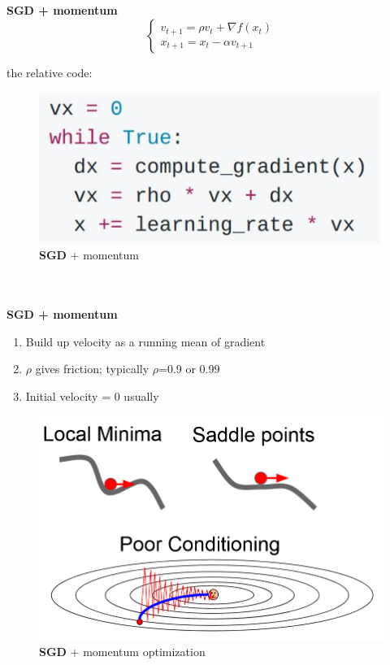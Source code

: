 \documentclass[11pt]{article}
\begin{document}
\begin{minipage}{0.5\textwidth}

\textbf{SGD + momentum}
\begin{equation}
\begin{cases}
v_{t+1}=\rho v_t+\nabla f(x_t) \\
    x_{t+1}=x_t-\alpha v_{t+1}
    \end{cases}{}
\end{equation}{}

the relative code:
\begin{figure} [H]
\centering 
\includegraphics[scale=0.58]{L611.pdf}
\caption{ \textbf{SGD} + momentum}
\label{fig:L611}
\end{figure}


\end{minipage}\\\\
\textbf{SGD + momentum}
\begin{enumerate}
    \item  Build up velocity as a running mean of gradient
    \item $\rho $ gives friction; typically $\rho$=0.9 or 0.99
    \item Initial velocity = 0 usually
\end{enumerate}
\clearpage
\begin{minipage}{0.5\textwidth}

\begin{figure} [H]
\centering 
\includegraphics[scale=0.46]{L612.pdf}
\caption{ \textbf{SGD} + momentum optimization}
\label{fig:L612}
\end{figure}
\end{minipage}
\end{document}
